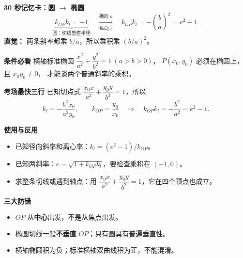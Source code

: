\begin{summarybox}
\textbf{\textcolor{CSummary}{30 秒记忆卡：圆 $\to$ 椭圆}}
\[
 \underbrace{k_{OP}k_l=-1}_{\text{圆：切线垂直半径}}
 \quad\xrightarrow[\text{纵向 }b]{\text{横向 }a}\quad
 \boxed{k_{OP}k_l=-\left(\frac ba\right)^2=e^2-1}.
\]
\textbf{直觉：} 两条斜率都乘 $b/a$，所以乘积乘 $(b/a)^2$。

\medskip
\textbf{\textcolor{CSummary}{条件必看}}
横轴标准椭圆
$\dfrac{x^2}{a^2}+\dfrac{y^2}{b^2}=1\ (a>b>0)$，
$P(x_0,y_0)$ 必须在椭圆上，且 $x_0y_0\ne0$，
才能谈两个普通斜率的乘积。

\medskip
\textbf{\textcolor{CSummary}{考场最快三行}}
已知切点式
$\dfrac{x_0x}{a^2}+\dfrac{y_0y}{b^2}=1$，所以
\[
 k_l=-\frac{b^2x_0}{a^2y_0},\qquad
 k_{OP}=\frac{y_0}{x_0}
 \quad\Longrightarrow\quad
 \boxed{k_{OP}k_l=-\frac{b^2}{a^2}=e^2-1}.
\]

\medskip
\textbf{\textcolor{CSummary}{使用与反用}}
\begin{itemize}[leftmargin=*, itemsep=0.35em, topsep=0.3em]
\item 已知径向斜率和离心率：$k_l=(e^2-1)/k_{OP}$。
\item 已知两斜率：$e=\sqrt{1+k_{OP}k_l}$，要检查乘积在 $(-1,0)$。
\item 求整条切线或遇到轴点：用
$\dfrac{x_0x}{a^2}+\dfrac{y_0y}{b^2}=1$，它在四个顶点也成立。
\end{itemize}

\medskip
\textbf{\textcolor{CSummary}{三大防错}}
\begin{itemize}[leftmargin=*, itemsep=0.3em, topsep=0.3em]
\item $OP$ 从\textbf{中心}出发，不是从焦点出发。
\item 椭圆切线一般\textbf{不垂直} $OP$；只有圆具有普遍垂直性。
\item 横轴椭圆积为负；标准横轴双曲线积为正，不能混淆。
\end{itemize}
\end{summarybox}
